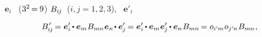 

\label{section:tensoranditscomponents}


~${\bm{e}_i}$
~(${3^2 \hspace{-0.24ex}=\hspace{-0.12ex} 9}$)
$B_{i\hspace{-0.1ex}j}$~(${i, j = 1, 2, 3}$),
~${\bm{e}'_i}$

\nopagebreak\vspace{-0.25em}\begin{equation}\label{orthotransform:2}
B\hspace{.16ex}'_{\hspace{-0.33ex}i\hspace{-0.1ex}j} \hspace{-0.2ex}
= \bm{e}'_i \hspace{-0.15ex} \dotp \bm{e}_m \hspace{.1ex} \somebivalenttensorcomponents{mn} \hspace{.1ex} \bm{e}_n \hspace{-0.3ex} \dotp \bm{e}'_{\hspace{-0.1ex}j} \hspace{-0.2ex}
= \bm{e}'_i \hspace{-0.15ex} \dotp \bm{e}_m \hspace{.1ex} \bm{e}'_{\hspace{-0.1ex}j} \hspace{-0.15ex} \dotp \bm{e}_n \hspace{.1ex} \somebivalenttensorcomponents{mn} \hspace{-0.2ex}
= \cosinematrix{i'\hspace{-0.1ex}m} \hspace{.1ex} \cosinematrix{j'\hspace{-0.1ex}n} \hspace{.1ex} \somebivalenttensorcomponents{mn}
\hspace{.1ex} ,
\end{equation}

